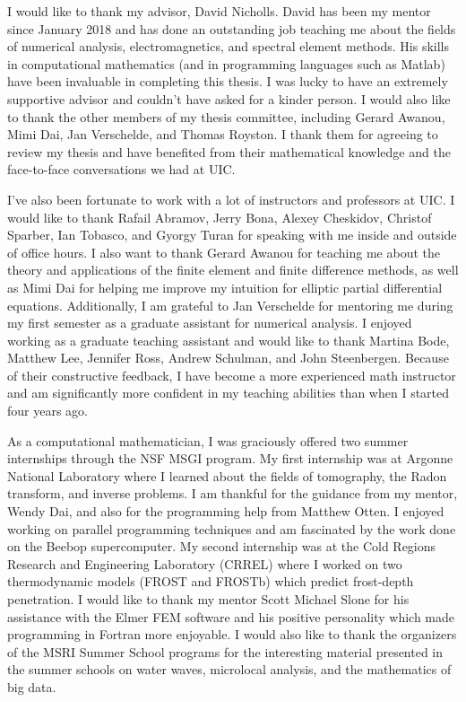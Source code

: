 
\acknowledgments
\label{Sec:Acknowledgments}
I would like to thank my advisor, David Nicholls. David has been my mentor since January 2018 and has done an outstanding job teaching me about the fields of numerical analysis, electromagnetics, and spectral element methods. His skills in computational mathematics (and in programming languages such as Matlab) have been invaluable in completing this thesis. I was lucky to have an extremely supportive advisor and couldn't have asked for a kinder person. I would also like to thank the other members of my thesis committee, including Gerard Awanou, Mimi Dai, Jan Verschelde, and Thomas Royston. I thank them for agreeing to review my thesis and have benefited from their mathematical knowledge and the face-to-face conversations we had at UIC.

I've also been fortunate to work with a lot of instructors and professors at UIC. I would like to thank Rafail Abramov, Jerry Bona, Alexey Cheskidov, Christof Sparber, Ian Tobasco, and Gyorgy Turan for speaking with me inside and outside of office hours. I also want to thank Gerard Awanou for teaching me about the theory and applications of the finite element and finite difference methods, as well as Mimi Dai for helping me improve my intuition for elliptic partial differential equations.  Additionally, I am grateful to Jan Verschelde for mentoring me during my first semester as a graduate assistant for numerical analysis. I enjoyed working as a graduate teaching assistant and would like to thank Martina Bode, Matthew Lee, Jennifer Ross, Andrew Schulman, and John Steenbergen. Because of their constructive feedback, I have become a more experienced math instructor and am significantly more confident in my teaching abilities than when I started four years ago.

As a computational mathematician, I was graciously offered two summer internships through the NSF MSGI program. My first internship was at Argonne National Laboratory where I learned about the fields of tomography, the Radon transform, and inverse problems. I am thankful for the guidance from my mentor, Wendy Dai, and also for the programming help from Matthew Otten. I enjoyed working on parallel programming techniques and am fascinated by the work done on the Beebop supercomputer. My second internship was at the Cold Regions Research and Engineering Laboratory (CRREL) where I worked on two thermodynamic models (FROST and FROSTb) which predict  frost-depth penetration. I would like to thank my mentor Scott Michael Slone for his assistance with the Elmer FEM software and his positive personality which made programming in Fortran more enjoyable. I would also like to thank the organizers of the MSRI Summer School programs for the interesting material presented in the summer schools on water waves, microlocal analysis, and the mathematics of big data.

